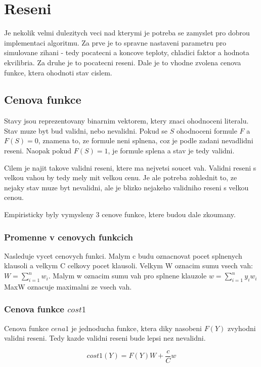 \documentclass[12pt,a4paper]{article}
\begin{document}
\section{Reseni}
Je nekolik velmi dulezitych veci nad kterymi je potreba se zamyslet pro dobrou implementaci algoritmu. Za prve je to spravne nastaveni parametru pro simulovane zihani - tedy pocatecni a koncove teploty, chladici faktor a hodnota ekvilibria. Za druhe je to pocatecni reseni. Dale je to vhodne zvolena cenova funkce, ktera ohodnoti stav cislem.


\subsection{Cenova funkce}

Stavy jsou reprezentovany binarnim vektorem, ktery znaci ohodnoceni literalu. Stav muze byt bud validni, nebo nevalidni. Pokud se $S$ ohodnoceni formule $F$ a $F(S) = 0$, znamena to, ze formule neni splnena, coz je podle zadani nevadlidni reseni. Naopak pokud $F(S) = 1$, je formule splena a stav je tedy validni.

Cilem je najit takove validni reseni, ktere ma nejvetsi soucet vah. Validni reseni s velkou vahou by tedy mely mit velkou cenu. Je ale potreba zohlednit to, ze nejaky stav muze byt nevalidni, ale je blizko nejakeho validniho reseni s velkou cenou.

Empiristicky byly vymysleny 3 cenove funkce, ktere budou dale zkoumany.

\subsubsection{Promenne v cenovych funkcich}

Nasleduje vycet cenovych funkci. Malym c budu oznacnovat pocet splnenych klausoli a velkym C celkovy pocet klausoli. Velkym W oznacim sumu vsech vah: $W = \sum_{i=1}^{n}{w_i}$. Malym w oznacim sumu vah pro splnene klauzole $w = \sum_{i=1}^{n}{y_i w_i}$ MaxW oznacuje maximalni ze vsech vah.

\subsubsection{Cenova funkce $cost1$}

Cenova funkce $cena1$ je jednoducha funkce, ktera diky nasobeni $F(Y)$ zvyhodni validni reseni. Tedy kazde validni reseni bude lepsi nez nevalidni.

$$ cost1(Y) = F(Y)W + \frac{c}{C}w $$
\end{document}
